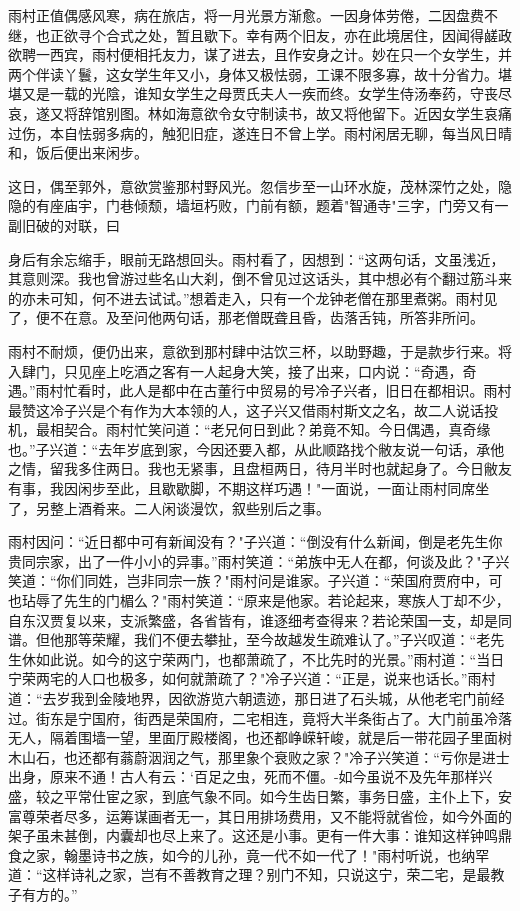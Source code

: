 雨村正值偶感风寒，病在旅店，将一月光景方渐愈。一因身体劳倦，二因盘费不继，也正欲寻个合式之处，暂且歇下。幸有两个旧友，亦在此境居住，因闻得鹾政欲聘一西宾，雨村便相托友力，谋了进去，且作安身之计。妙在只一个女学生，并两个伴读丫鬟，这女学生年又小，身体又极怯弱，工课不限多寡，故十分省力。堪堪又是一载的光陰，谁知女学生之母贾氏夫人一疾而终。女学生侍汤奉药，守丧尽哀，遂又将辞馆别图。林如海意欲令女守制读书，故又将他留下。近因女学生哀痛过伤，本自怯弱多病的，触犯旧症，遂连日不曾上学。雨村闲居无聊，每当风日晴和，饭后便出来闲步。

这日，偶至郭外，意欲赏鉴那村野风光。忽信步至一山环水旋，茂林深竹之处，隐隐的有座庙宇，门巷倾颓，墙垣朽败，门前有额，题着"智通寺"三字，门旁又有一副旧破的对联，曰

身后有余忘缩手，眼前无路想回头。雨村看了，因想到：“这两句话，文虽浅近，其意则深。我也曾游过些名山大刹，倒不曾见过这话头，其中想必有个翻过筋斗来的亦未可知，何不进去试试。”想着走入，只有一个龙钟老僧在那里煮粥。雨村见了，便不在意。及至问他两句话，那老僧既聋且昏，齿落舌钝，所答非所问。

雨村不耐烦，便仍出来，意欲到那村肆中沽饮三杯，以助野趣，于是款步行来。将入肆门，只见座上吃酒之客有一人起身大笑，接了出来，口内说：“奇遇，奇遇。”雨村忙看时，此人是都中在古董行中贸易的号冷子兴者，旧日在都相识。雨村最赞这冷子兴是个有作为大本领的人，这子兴又借雨村斯文之名，故二人说话投机，最相契合。雨村忙笑问道：“老兄何日到此？弟竟不知。今日偶遇，真奇缘也。”子兴道：“去年岁底到家，今因还要入都，从此顺路找个敝友说一句话，承他之情，留我多住两日。我也无紧事，且盘桓两日，待月半时也就起身了。今日敝友有事，我因闲步至此，且歇歇脚，不期这样巧遇！"一面说，一面让雨村同席坐了，另整上酒肴来。二人闲谈漫饮，叙些别后之事。

雨村因问：“近日都中可有新闻没有？"子兴道：“倒没有什么新闻，倒是老先生你贵同宗家，出了一件小小的异事。”雨村笑道：“弟族中无人在都，何谈及此？"子兴笑道：“你们同姓，岂非同宗一族？"雨村问是谁家。子兴道：“荣国府贾府中，可也玷辱了先生的门楣么？"雨村笑道：“原来是他家。若论起来，寒族人丁却不少，自东汉贾复以来，支派繁盛，各省皆有，谁逐细考查得来？若论荣国一支，却是同谱。但他那等荣耀，我们不便去攀扯，至今故越发生疏难认了。”子兴叹道：“老先生休如此说。如今的这宁荣两门，也都萧疏了，不比先时的光景。”雨村道：“当日宁荣两宅的人口也极多，如何就萧疏了？"冷子兴道：“正是，说来也话长。”雨村道：“去岁我到金陵地界，因欲游览六朝遗迹，那日进了石头城，从他老宅门前经过。街东是宁国府，街西是荣国府，二宅相连，竟将大半条街占了。大门前虽冷落无人，隔着围墙一望，里面厅殿楼阁，也还都峥嵘轩峻，就是后一带花园子里面树木山石，也还都有蓊蔚洇润之气，那里象个衰败之家？"冷子兴笑道：“亏你是进士出身，原来不通！古人有云：`百足之虫，死而不僵。-如今虽说不及先年那样兴盛，较之平常仕宦之家，到底气象不同。如今生齿日繁，事务日盛，主仆上下，安富尊荣者尽多，运筹谋画者无一，其日用排场费用，又不能将就省俭，如今外面的架子虽未甚倒，内囊却也尽上来了。这还是小事。更有一件大事：谁知这样钟鸣鼎食之家，翰墨诗书之族，如今的儿孙，竟一代不如一代了！"雨村听说，也纳罕道：“这样诗礼之家，岂有不善教育之理？别门不知，只说这宁，荣二宅，是最教子有方的。”

